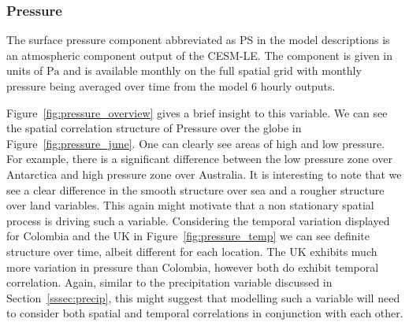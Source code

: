 \subsubsection{Pressure \label{sssec:pressure}}
The surface pressure component abbreviated as PS in the model descriptions is an atmospheric component output of the CESM-LE.
The component is given in units of $\si{\pascal}$ and is available monthly on the full spatial grid with monthly pressure being averaged over time from the model 6 hourly outputs.

Figure~\ref{fig:pressure_overview} gives a brief insight to this variable. 
We can see the spatial correlation structure of Pressure over the globe in Figure~\ref{fig:pressure_june}.
One can clearly see areas of high and low pressure.
For example, there is a significant difference between the low pressure zone over Antarctica and high pressure zone over Australia. 
It is interesting to note that we see a clear difference in the smooth structure over sea and a rougher structure over land variables. 
This again might motivate that a non stationary spatial process is driving such a variable.
Considering the temporal variation displayed for Colombia and the UK in Figure~\ref{fig:pressure_temp} we can see definite structure over time, albeit different for each location.
The UK exhibits much more variation in pressure than Colombia, however both do exhibit temporal correlation. 
Again, similar to the precipitation variable discussed in Section~\ref{sssec:precip}, this might suggest that modelling such a variable will need to consider both spatial and temporal correlations in conjunction with each other.

